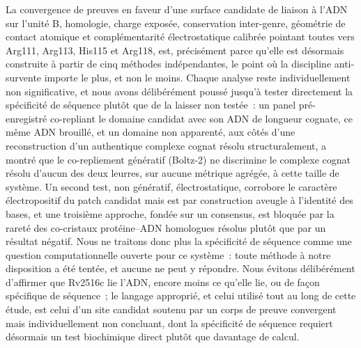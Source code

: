 \documentclass[11pt,a4paper]{article}
\begin{document}
La convergence de preuves en faveur d'une surface candidate de liaison à l'ADN sur l'unité B,
homologie, charge exposée, conservation inter-genre, géométrie de contact atomique et
complémentarité électrostatique calibrée pointant
toutes vers Arg111, Arg113, His115 et Arg118, est, précisément parce qu'elle est désormais
construite à partir de cinq méthodes indépendantes, le point où la discipline anti-survente
importe le plus, et non le moins. Chaque analyse reste individuellement non significative, et nous
avons délibérément poussé jusqu'à tester directement la spécificité de séquence plutôt que de la
laisser non testée~: un panel pré-enregistré co-repliant le domaine candidat avec son ADN de
longueur cognate, ce même ADN brouillé, et un domaine non apparenté, aux côtés d'une reconstruction
d'un authentique complexe cognat résolu structuralement, a montré que le co-repliement génératif
(Boltz-2) ne discrimine le complexe cognat résolu d'aucun des deux leurres, sur aucune métrique
agrégée, à cette taille de système. Un second test, non génératif, électrostatique, corrobore le
caractère électropositif du patch candidat mais est par construction aveugle à l'identité des bases,
et une troisième approche, fondée sur un consensus, est bloquée par la rareté des co-cristaux
protéine--ADN homologues résolus plutôt que par un résultat négatif. Nous ne traitons donc plus la
spécificité de séquence comme une question computationnelle ouverte pour ce système~: toute méthode
à notre disposition a été tentée, et aucune ne peut y répondre. Nous évitons
délibérément d'affirmer que Rv2516c lie l'ADN, encore moins ce qu'elle lie, ou de façon spécifique
de séquence~; le langage approprié,
et celui utilisé tout au long de cette étude, est celui d'un site candidat soutenu par un corps de
preuve convergent mais individuellement non concluant, dont la spécificité de séquence requiert
désormais un test biochimique direct plutôt que davantage de calcul.
\end{document}
